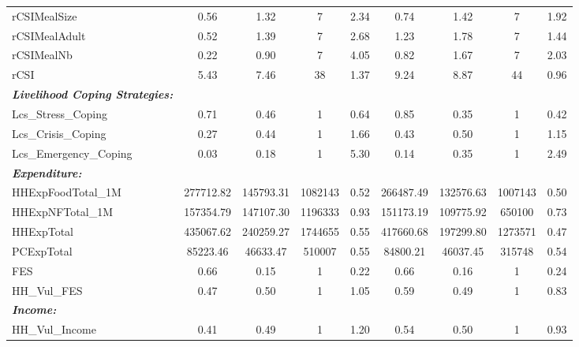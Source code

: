 {\begin{tabular}{l*{2}{cccc}}
rCSIMealSize&        0.56&        1.32&           7&        2.34&        0.74&        1.42&           7&        1.92\\
rCSIMealAdult&        0.52&        1.39&           7&        2.68&        1.23&        1.78&           7&        1.44\\
rCSIMealNb  &        0.22&        0.90&           7&        4.05&        0.82&        1.67&           7&        2.03\\
rCSI        &        5.43&        7.46&          38&        1.37&        9.24&        8.87&          44&        0.96\\
  \textbf{\textit{Livelihood Coping Strategies:}}&            &            &            &            &            &            &            &            \\
Lcs\_Stress\_Coping&        0.71&        0.46&           1&        0.64&        0.85&        0.35&           1&        0.42\\
Lcs\_Crisis\_Coping&        0.27&        0.44&           1&        1.66&        0.43&        0.50&           1&        1.15\\
Lcs\_Emergency\_Coping&        0.03&        0.18&           1&        5.30&        0.14&        0.35&           1&        2.49\\
  \textbf{\textit{Expenditure:}}&            &            &            &            &            &            &            &            \\
HHExpFoodTotal\_1M&   277712.82&   145793.31&     1082143&        0.52&   266487.49&   132576.63&     1007143&        0.50\\
HHExpNFTotal\_1M&   157354.79&   147107.30&     1196333&        0.93&   151173.19&   109775.92&      650100&        0.73\\
HHExpTotal  &   435067.62&   240259.27&     1744655&        0.55&   417660.68&   197299.80&     1273571&        0.47\\
PCExpTotal  &    85223.46&    46633.47&      510007&        0.55&    84800.21&    46037.45&      315748&        0.54\\
FES         &        0.66&        0.15&           1&        0.22&        0.66&        0.16&           1&        0.24\\
HH\_Vul\_FES  &        0.47&        0.50&           1&        1.05&        0.59&        0.49&           1&        0.83\\
      \textbf{\textit{Income:}}&            &            &            &            &            &            &            &            \\
HH\_Vul\_Income&        0.41&        0.49&           1&        1.20&        0.54&        0.50&           1&        0.93\\
\hline\hline
\end{tabular}
}

